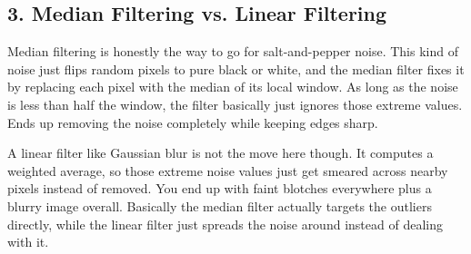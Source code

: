 \subsection*{3. Median Filtering vs. Linear Filtering}

Median filtering is honestly the way to go for salt-and-pepper noise. This kind of noise just flips random pixels to pure black or white, and the median filter fixes it by replacing each pixel with the median of its local window. As long as the noise is less than half the window, the filter basically just ignores those extreme values. Ends up removing the noise completely while keeping edges sharp.

A linear filter like Gaussian blur is not the move here though. It computes a weighted average, so those extreme noise values just get smeared across nearby pixels instead of removed. You end up with faint blotches everywhere plus a blurry image overall. Basically the median filter actually targets the outliers directly, while the linear filter just spreads the noise around instead of dealing with it.